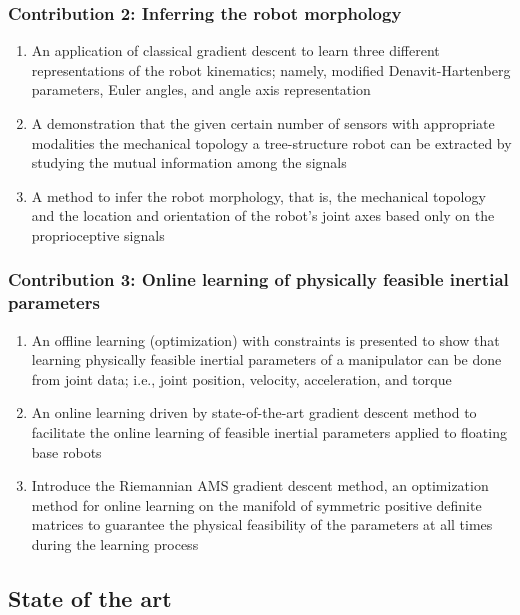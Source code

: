\documentclass[12pt, a4paper]{article}
\begin{document}
\begin{enumerate}
\subsubsection*{Contribution 2: Inferring the robot morphology}
\begin{enumerate}
	\item An application of classical gradient descent to learn three different representations of the robot kinematics; namely, modified Denavit-Hartenberg parameters, Euler angles, and angle axis representation
	\item A demonstration that the given certain number of sensors with appropriate modalities the mechanical topology a tree-structure robot can be extracted by studying the mutual information among the signals
	\item A method to infer the robot morphology, that is, the mechanical topology and the location and orientation of the robot's joint axes based only on the proprioceptive signals

\end{enumerate}

\subsubsection*{Contribution 3: Online learning of physically feasible inertial parameters}
\begin{enumerate}
	\item An offline learning (optimization) with constraints is presented to show that learning physically feasible inertial parameters of a manipulator can be done from joint data; i.e., joint position, velocity, acceleration, and torque
	\item An online learning driven by state-of-the-art gradient descent method to facilitate the online learning of feasible inertial parameters applied to floating base robots 
	\item Introduce the Riemannian AMS gradient descent method, an optimization method for online learning on the manifold of symmetric positive definite matrices to guarantee the physical feasibility of the parameters at all times during the learning process
\end{enumerate}

\subsection*{State of the art}


	
	
\end{enumerate}
\end{document}
